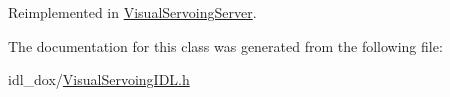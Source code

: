 Reimplemented in \hyperlink{classVisualServoingServer_afcd501bb1d5070e8a0735f422a4c9ac0}{Visual\+Servoing\+Server}.



The documentation for this class was generated from the following file\+:\begin{DoxyCompactItemize}
\item 
idl\+\_\+dox/\hyperlink{VisualServoingIDL_8h}{Visual\+Servoing\+I\+D\+L.\+h}\end{DoxyCompactItemize}
